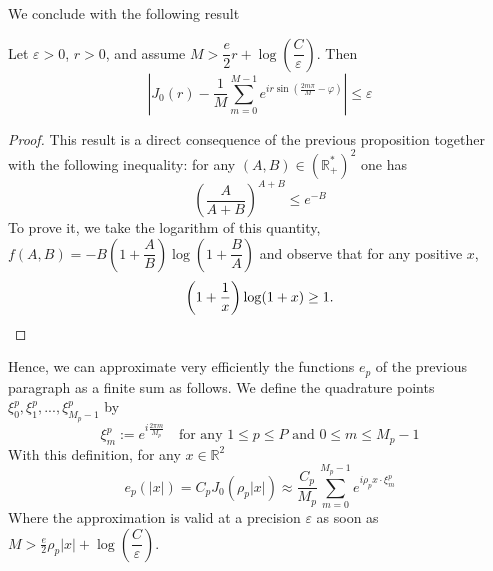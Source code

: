 \documentclass[11pt,a4paper]{article}
\begin{document}
We conclude with the following result
\begin{Prop} Let $\varepsilon >0$, $r>0$, and assume $M > \dfrac{e}{2}r + \log\left(\dfrac{C}{\varepsilon}\right)$. Then 
	\[\left|J_0(r) -  \dfrac{1}{M}\sum_{m=0}^{M-1}e^{ir\sin\left(\frac{2m\pi}{M}-\varphi\right)} \right| \leq \varepsilon \]
	\label{suboptCirc}
	\begin{proof}
		This result is a direct consequence of the previous proposition together with the following inequality: for any $(A,B) \in \left(\mathbb{R}_+^*\right)^2$ one has
		\[ \left( \dfrac{A}{A+B}\right)^{A+B} \leq e^{-B}\]
		To prove it, we take the logarithm of this quantity, $f(A,B) = -B\left(1+\dfrac{A}{B}\right)\log\left(1+\dfrac{B}{A}\right)$ and observe that for any positive $x$, \[\left(1+\dfrac{1}{x}\right)\log(1+x) \geq 1.\qedhere\]
	\end{proof}
\end{Prop}

Hence, we can approximate very efficiently the functions $e_p$ of the previous paragraph as a finite sum as follows. We define the quadrature points $\xi_0^p, \xi_1^p, ..., \xi^p_{M_p-1}$  by
\begin{equation}
	\label{defXimp}
	\xi_m^p := \displaystyle e^{i\frac{2\pi m}{M_p}} \quad \text{for any } 1\leq p \leq P  \text{ and } 0 \leq m \leq M_p -1
\end{equation}
With this definition, for any $x \in \mathbb{R}^2$
\[ e_p(|x|) = C_p J_0(\rho_p |x|)\approx \dfrac{C_p}{M_p}\sum_{m=0}^{M_p-1}{e^{i \rho_px \cdot \xi_m^p}}\]
Where the approximation is valid at a precision $\varepsilon$ as soon as $M > \frac{e}{2}\rho_p|x| + \log\left(\dfrac{C}{\varepsilon}\right)$.



																																							

																																									
\end{document}
